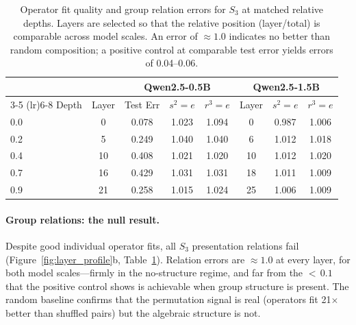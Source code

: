 \documentclass[10pt, letterpaper]{article}
\begin{document}
\begin{table}[t]
\centering
\caption{Operator fit quality and group relation errors for $S_3$ at matched relative depths. Layers are selected so that the relative position (layer/total) is comparable across model scales. An error of $\approx 1.0$ indicates no better than random composition; a positive control at comparable test error yields errors of 0.04--0.06.}
\label{tab:alignment}
\small
\begin{tabular}{@{}lccccccc@{}}
\toprule
& & \multicolumn{3}{c}{Qwen2.5-0.5B} & \multicolumn{3}{c}{Qwen2.5-1.5B} \\
\cmidrule(lr){3-5} \cmidrule(lr){6-8}
Depth & Layer & Test Err & $s^2\!=\!e$ & $r^3\!=\!e$ & Layer & $s^2\!=\!e$ & $r^3\!=\!e$ \\
\midrule
0.0  & 0  & 0.078 & 1.023 & 1.094 & 0 & 0.987 & 1.006 \\
0.2  & 5  & 0.249 & 1.040 & 1.040 & 6 & 1.012 & 1.018 \\
0.4  & 10 & 0.408 & 1.021 & 1.020 & 10 & 1.012 & 1.020 \\
0.7  & 16 & 0.429 & 1.031 & 1.031 & 18 & 1.011 & 1.009 \\
0.9  & 21 & 0.258 & 1.015 & 1.024 & 25 & 1.006 & 1.009 \\
\bottomrule
\end{tabular}
\end{table}

\paragraph{Group relations: the null result.} Despite good individual operator fits, all $S_3$ presentation relations fail (Figure~\ref{fig:layer_profile}b, Table~\ref{tab:alignment}). Relation errors are $\approx 1.0$ at every layer, for both model scales---firmly in the no-structure regime, and far from the ${<}\,0.1$ that the positive control shows is achievable when group structure is present. The random baseline confirms that the permutation signal is real (operators fit 21$\times$ better than shuffled pairs) but the algebraic structure is not.
\end{document}
